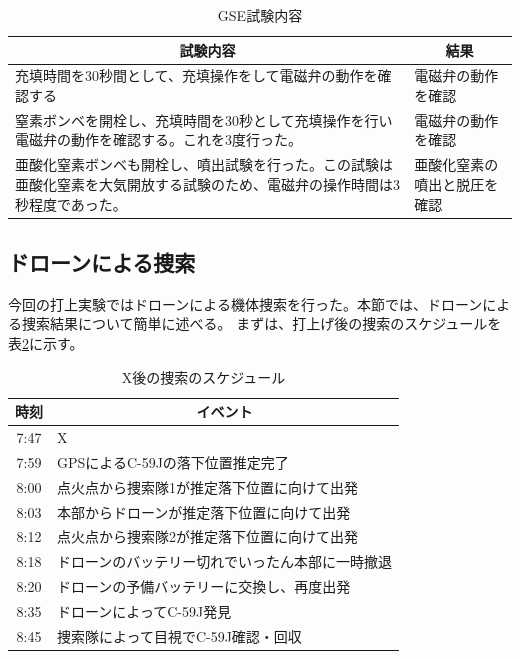 \documentclass[a4paper,11pt,uplatex]{jsarticle}
\begin{document}
\begin{table}[H]
	\centering
	\caption{GSE試験内容}
	\begin{tabular}{p{90mm}l} \toprule
		\multicolumn{1}{c}{試験内容}                                        & \multicolumn{1}{c}{結果} \\  \midrule
		充填時間を30秒間として、充填操作をして電磁弁の動作を確認する                                 & 電磁弁の動作を確認              \\ \midrule
		窒素ボンベを開栓し、充填時間を30秒として充填操作を行い電磁弁の動作を確認する。これを3度行った。               & 電磁弁の動作を確認              \\ \midrule
		亜酸化窒素ボンベも開栓し、噴出試験を行った。この試験は亜酸化窒素を大気開放する試験のため、電磁弁の操作時間は3秒程度であった。 & 亜酸化窒素の噴出と脱圧を確認         \\
		\bottomrule
	\end{tabular}
	\label{gse_mokuteki}
\end{table}

\subsection{ドローンによる捜索}
今回の打上実験ではドローンによる機体捜索を行った。本節では、ドローンによる捜索結果について簡単に述べる。
まずは、打上げ後の捜索のスケジュールを表\ref{tab:find}に示す。

\begin{table}[H]
	\centering
	\caption{X後の捜索のスケジュール}
	\begin{tabular}{cl} \toprule
		時刻   & \multicolumn{1}{c}{イベント} \\ \midrule
		7:47 & X                        \\
		7:59 & GPSによるC-59Jの落下位置推定完了     \\
		8:00 & 点火点から捜索隊1が推定落下位置に向けて出発   \\
		8:03 & 本部からドローンが推定落下位置に向けて出発    \\
		8:12 & 点火点から捜索隊2が推定落下位置に向けて出発   \\
		8:18 & ドローンのバッテリー切れでいったん本部に一時撤退 \\
		8:20 & ドローンの予備バッテリーに交換し、再度出発    \\
		8:35 & ドローンによってC-59J発見          \\
		8:45 & 捜索隊によって目視でC-59J確認・回収     \\
		\bottomrule
	\end{tabular}
	\label{tab:find}
\end{table}
\end{document}
